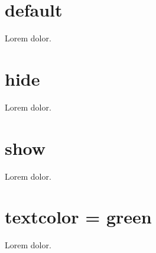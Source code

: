 \documentclass{article}
\begin{document}
\section{default}

Lorem  dolor.

\section{hide}

\clozehide

Lorem  dolor.

\section{show}

\clozeshow

Lorem  dolor.

\section{textcolor = green}


Lorem  dolor.
\end{document}
